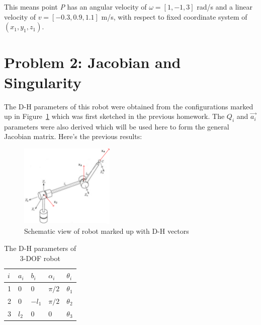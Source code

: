 \documentclass[conference]{IEEEtran}
\begin{document}
This means point \textit{P} has an angular velocity of $\omega = \left[1, -1, 3\right]$ rad/s and a linear velocity of $v = \left[-0.3, 0.9, 1.1\right]$ m/s, with respect to fixed coordinate system of \((x_1, y_1, z_1)\).

\section{Problem 2: Jacobian and Singularity}
The D-H parameters of this robot were obtained from the configurations marked up in Figure~\ref{fig:prob2} which was first sketched in the previous homework. The \(Q_i\) and \(\vec{a_i}\) parameters were also derived which will be used here to form the general Jacobian matrix. Here's the previous results:

\begin{figure}[htbp]
    \centerline{\includegraphics[width=0.4\textwidth]{figures/prob2.png}}
    \caption{Schematic view of robot marked up with D-H vectors}
    \label{fig:prob2}
\end{figure}

\begin{table}[htbp]
    \caption{The D-H parameters of 3-DOF robot}
    \def\arraystretch{1.75}
    \begin{center}
        \begin{tabular}{|Y|Y|Y|Y|Y|}
            \hline
            $i$ & $a_i$ & $b_i$  & $\alpha_i$ & $\theta_i$ \\
               & 0     & 0      & $\pi / 2$  & $\theta_1$ \\
               & 0     & $-l_1$ & $\pi / 2$  & $\theta_2$ \\
               & $l_2$ & 0      & 0          & $\theta_3$ \\
            \hline
        \end{tabular}
    \end{center}
\end{table}
\end{document}
